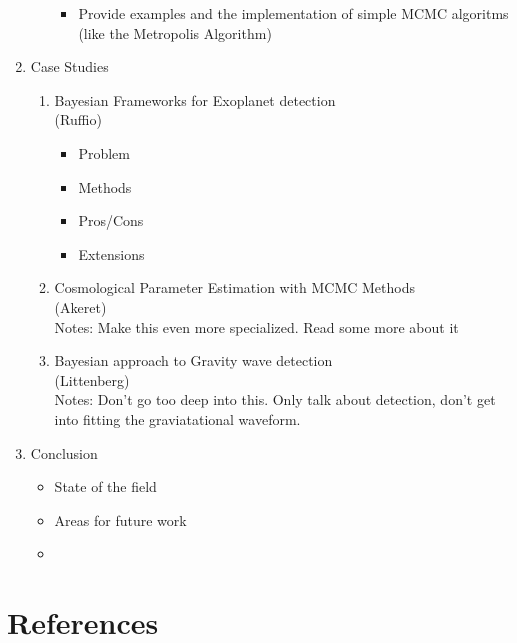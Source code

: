 \documentclass[12pt]{article}
\begin{document}
\begin{enumerate}
\begin{enumerate}
\begin{itemize}
      \item Provide examples and the implementation of simple MCMC algoritms (like the Metropolis Algorithm)
    \end{itemize}
  \end{enumerate}
  \item Case Studies
  \begin{enumerate}
    \item Bayesian Frameworks for Exoplanet detection \\ (Ruffio)
    \begin{itemize}
      \item Problem
      \item Methods
      \item Pros/Cons
      \item Extensions
    \end{itemize}
    \item Cosmological Parameter Estimation with MCMC Methods \\ (Akeret) \\ Notes: Make this even more specialized. Read some more about it
    \item Bayesian approach to Gravity wave detection \\ (Littenberg) \\ Notes: Don't go too deep into this. Only talk about detection, don't get into fitting the graviatational waveform.
  \end{enumerate}
  \item Conclusion
  \begin{itemize}
    \item State of the field
    \item Areas for future work
    \item 
  \end{itemize}
\end{enumerate}

\section*{References}
\end{document}
